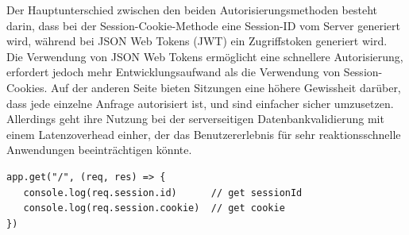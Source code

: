 Der Hauptunterschied zwischen den beiden Autorisierungsmethoden besteht darin, dass bei der Session-Cookie-Methode eine Session-ID vom Server generiert wird, während bei JSON Web Tokens (JWT) ein Zugriffstoken generiert wird. Die Verwendung von JSON Web Tokens ermöglicht eine schnellere Autorisierung, erfordert jedoch mehr Entwicklungsaufwand als die Verwendung von Session-Cookies. Auf der anderen Seite bieten Sitzungen eine höhere Gewissheit darüber, dass jede einzelne Anfrage autorisiert ist, und sind einfacher sicher umzusetzen. Allerdings geht ihre Nutzung bei der serverseitigen Datenbankvalidierung mit einem Latenzoverhead einher, der das Benutzererlebnis für sehr reaktionsschnelle Anwendungen beeinträchtigen könnte.

\begin{lstlisting}
app.get("/", (req, res) => {
   console.log(req.session.id)      // get sessionId
   console.log(req.session.cookie)  // get cookie
})
\end{lstlisting}

\cite{JWT}


